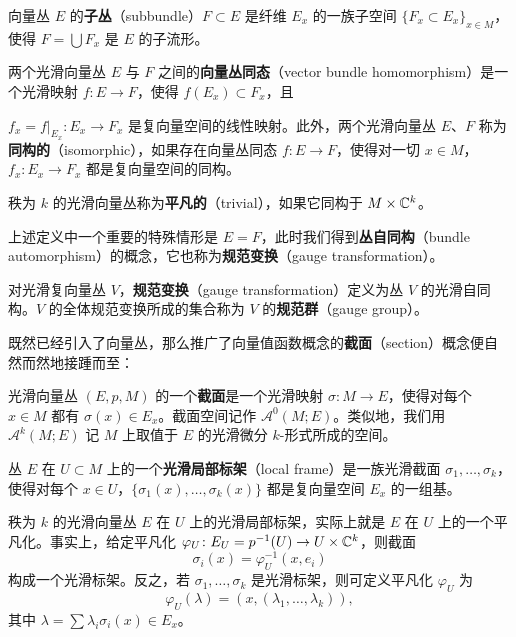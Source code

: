 \begin{definition}[3.5]
向量丛 $E$ 的\textbf{子丛}（subbundle）$F\subset E$ 是纤维 $E_x$ 的一族子空间 $\{F_x\subset E_x\}_{x\in M}$，使得 $F=\bigcup F_x$ 是 $E$ 的子流形。
\end{definition}

\begin{definition}[3.6]
两个光滑向量丛 $E$ 与 $F$ 之间的\textbf{向量丛同态}（vector bundle homomorphism）是一个光滑映射 $f\colon E\to F$，使得 $f(E_x)\subset F_x$，且
\end{definition}

$f_x=f|_{E_x}\colon E_x\to F_x$ 是复向量空间的线性映射。此外，两个光滑向量丛 $E$、$F$ 称为\textbf{同构的}（isomorphic），如果存在向量丛同态 $f\colon E\to F$，使得对一切 $x\in M$，$f_x\colon E_x\to F_x$ 都是复向量空间的同构。

秩为 $k$ 的光滑向量丛称为\textbf{平凡的}（trivial），如果它同构于 $M\times\mathbb{C}^k$。

上述定义中一个重要的特殊情形是 $E=F$，此时我们得到\textbf{丛自同构}（bundle automorphism）的概念，它也称为\textbf{规范变换}（gauge transformation）。

\begin{definition}[3.7]
对光滑复向量丛 $V$，\textbf{规范变换}（gauge transformation）定义为丛 $V$ 的光滑自同构。$V$ 的全体规范变换所成的集合称为 $V$ 的\textbf{规范群}（gauge group）。
\end{definition}

既然已经引入了向量丛，那么推广了向量值函数概念的\textbf{截面}（section）概念便自然而然地接踵而至：

\begin{definition}[3.8]
光滑向量丛 $(E,p,M)$ 的一个\textbf{截面}是一个光滑映射 $\sigma\colon M\to E$，使得对每个 $x\in M$ 都有 $\sigma(x)\in E_x$。截面空间记作 $\mathcal{A}^0(M;E)$。类似地，我们用 $\mathcal{A}^k(M;E)$ 记 $M$ 上取值于 $E$ 的光滑微分 $k$-形式所成的空间。
\end{definition}

\begin{definition}[3.9]
丛 $E$ 在 $U\subset M$ 上的一个\textbf{光滑局部标架}（local frame）是一族光滑截面 $\sigma_1,\dots,\sigma_k$，使得对每个 $x\in U$，$\{\sigma_1(x),\dots,\sigma_k(x)\}$ 都是复向量空间 $E_x$ 的一组基。
\end{definition}

秩为 $k$ 的光滑向量丛 $E$ 在 $U$ 上的光滑局部标架，实际上就是 $E$ 在 $U$ 上的一个平凡化。事实上，给定平凡化 $\varphi_U\colon E_U=p^{-1}(U)\to U\times\mathbb{C}^k$，则截面
\[
\sigma_i(x)=\varphi_U^{-1}(x,e_i)
\]
构成一个光滑标架。反之，若 $\sigma_1,\dots,\sigma_k$ 是光滑标架，则可定义平凡化 $\varphi_U$ 为
\[
\varphi_U(\lambda)=(x,(\lambda_1,\dots,\lambda_k)) ,
\]
其中 $\lambda=\sum\lambda_i\sigma_i(x)\in E_x$。

